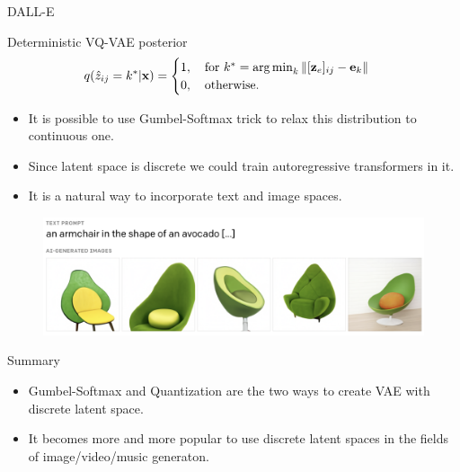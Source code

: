 \begin{frame}{DALL-E}
	\begin{block}{Deterministic VQ-VAE posterior}
		\vspace{-0.3cm}
		\[
			q(\hat{z}_{ij} = k^* | \mathbf{x}) = \begin{cases}
				1 , \quad \text{for } k^* = \operatorname*{arg\,min}_k \| [\mathbf{z}_e]_{ij} - \mathbf{e}_k \| \\
				0, \quad \text{otherwise}.
			\end{cases}
		\]
		\vspace{-0.3cm}
	\end{block}
	\begin{itemize}
		\item It is possible to use Gumbel-Softmax trick to relax this distribution to continuous one.
		\item Since latent space is discrete we could train autoregressive transformers in it.
		\item It is a natural way to incorporate text and image spaces.
	\end{itemize}
	\begin{figure}
		\includegraphics[width=\linewidth]{figs/dalle}
	\end{figure}
\end{frame}
\begin{frame}{Summary}
	\begin{itemize}
	\item Gumbel-Softmax and Quantization are the two ways to create VAE with discrete latent space.
	\vfill
	\item It becomes more and more popular to use discrete latent spaces in the fields of image/video/music generaton.
	\end{itemize}
\end{frame}
 